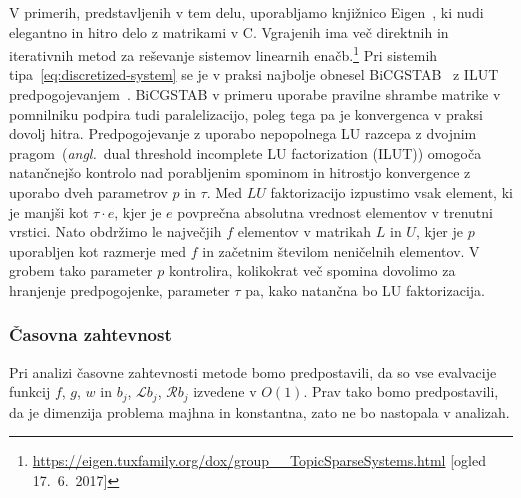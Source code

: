 \documentclass[12pt,a4paper,twoside]{article}
\theoremstyle{definition} %
\theoremstyle{plain} %
\numberwithin{equation}{section}
\newcommand{\Rc}{\mathcal{R}}
\renewcommand{\L}{\mathcal{L}}
\newcommand{\ang}[1]{(\hspace{-1.5px}\textit{angl.}\ #1)}
\newcommand{\CC}{C\nolinebreak\hspace{-.05em}\raisebox{.4ex}{\tiny\bf +}\nolinebreak\hspace{-.10em}\raisebox{.4ex}{\tiny\bf +}}
\begin{document}
V primerih, predstavljenih v tem delu, uporabljamo knjižnico Eigen~\cite{eigenweb}, ki nudi
elegantno in hitro delo z matrikami v \CC. Vgrajenih ima več direktnih in iterativnih metod za
reševanje sistemov linearnih
enačb.\footnote{\url{https://eigen.tuxfamily.org/dox/group__TopicSparseSystems.html}
[ogled 17.\ 6.\ 2017]}
Pri sistemih tipa~\eqref{eq:discretized-system} se je v praksi najbolje obnesel
BiCGSTAB~\cite{van1992bi} z ILUT predpogojevanjem~\cite{saad1994ilut}. BiCGSTAB v primeru uporabe
pravilne shrambe matrike v pomnilniku podpira tudi paralelizacijo, poleg tega pa je konvergenca v
praksi dovolj hitra. Predpogojevanje z uporabo nepopolnega LU razcepa z dvojnim pragom~\ang{dual
threshold incomplete LU factorization (ILUT)} omogoča natančnejšo kontrolo nad porabljenim spominom
in hitrostjo konvergence z uporabo dveh parametrov $p$ in $\tau$. Med $LU$ faktorizacijo izpustimo
vsak element, ki je manjši kot $\tau\cdot e$, kjer je $e$ povprečna absolutna vrednost elementov v
trenutni vrstici. Nato obdržimo le največjih $f$ elementov v matrikah $L$ in $U$, kjer je $p$
uporabljen kot razmerje med $f$ in začetnim številom neničelnih elementov. V grobem tako parameter
$p$ kontrolira, kolikokrat več spomina dovolimo za hranjenje predpogojenke, parameter $\tau$ pa, kako
natančna bo LU faktorizacija.

\subsubsection{Časovna zahtevnost}
\label{sec:casovna-zahtevnost}
Pri analizi časovne zahtevnosti metode bomo predpostavili, da so
vse evalvacije funkcij $f$, $g$, $w$ in $b_j$, $\L b_j$, $\Rc b_j$ izvedene v $O(1)$.
Prav tako bomo predpostavili, da je dimenzija problema majhna in konstantna,
zato ne bo nastopala v analizah.
\end{document}
